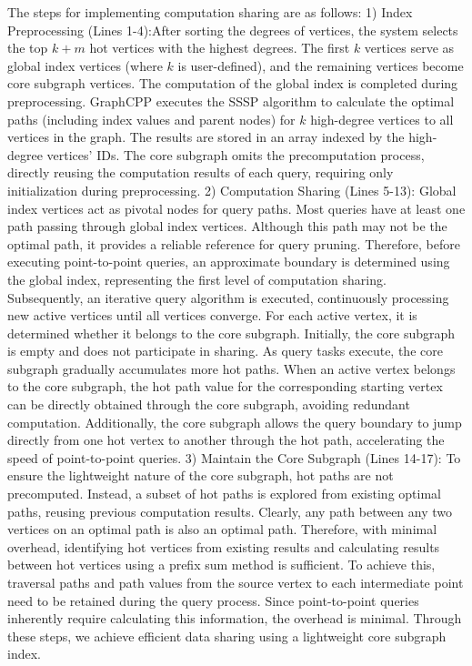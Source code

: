 \documentclass[lettersize,journal]{IEEEtran} %
\begin{document}
The steps for implementing computation sharing are as follows:
1) Index Preprocessing (Lines 1-4):After sorting the degrees of vertices, the system selects the top $k+m$ hot vertices with the highest degrees. The first $k$ vertices serve as global index vertices (where $k$ is user-defined), and the remaining vertices become core subgraph vertices. The computation of the global index is completed during preprocessing. GraphCPP executes the SSSP algorithm to calculate the optimal paths (including index values and parent nodes) for $k$ high-degree vertices to all vertices in the graph. The results are stored in an array indexed by the high-degree vertices' IDs. The core subgraph omits the precomputation process, directly reusing the computation results of each query, requiring only initialization during preprocessing.
2) Computation Sharing (Lines 5-13): Global index vertices act as pivotal nodes for query paths. Most queries have at least one path passing through global index vertices. Although this path may not be the optimal path, it provides a reliable reference for query pruning. Therefore, before executing point-to-point queries, an approximate boundary is determined using the global index, representing the first level of computation sharing. Subsequently, an iterative query algorithm is executed, continuously processing new active vertices until all vertices converge. For each active vertex, it is determined whether it belongs to the core subgraph. Initially, the core subgraph is empty and does not participate in sharing. As query tasks execute, the core subgraph gradually accumulates more hot paths. When an active vertex belongs to the core subgraph, the hot path value for the corresponding starting vertex can be directly obtained through the core subgraph, avoiding redundant computation. Additionally, the core subgraph allows the query boundary to jump directly from one hot vertex to another through the hot path, accelerating the speed of point-to-point queries.
3) Maintain the Core Subgraph (Lines 14-17): To ensure the lightweight nature of the core subgraph, hot paths are not precomputed. Instead, a subset of hot paths is explored from existing optimal paths, reusing previous computation results. Clearly, any path between any two vertices on an optimal path is also an optimal path. Therefore, with minimal overhead, identifying hot vertices from existing results and calculating results between hot vertices using a prefix sum method is sufficient. To achieve this, traversal paths and path values from the source vertex to each intermediate point need to be retained during the query process. Since point-to-point queries inherently require calculating this information, the overhead is minimal. Through these steps, we achieve efficient data sharing using a lightweight core subgraph index.
\end{document}
